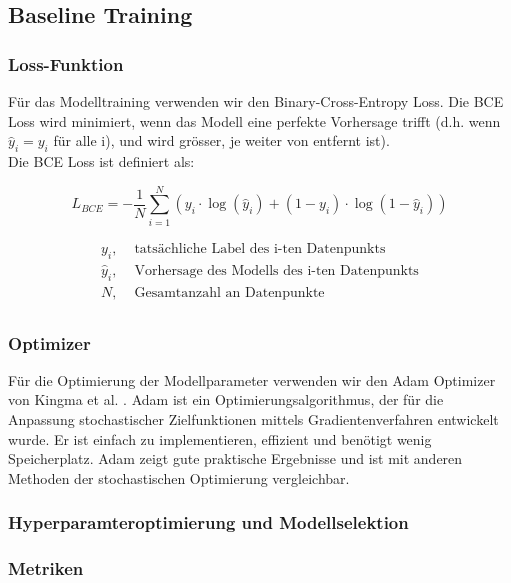 \subsection{Baseline Training}

\subsubsection{Loss-Funktion}
Für das Modelltraining verwenden wir den Binary-Cross-Entropy Loss. Die BCE Loss wird minimiert, wenn das Modell eine perfekte Vorhersage trifft (d.h. wenn $\hat{y}_i = y_i$ für alle i), und wird grösser, je weiter von entfernt ist).  \\
Die BCE Loss ist definiert als:

\begin{equation}
    L_{BCE} = -\frac{1}{N} \sum_{i=1}^{N} (y_i \cdot \log(\hat{y}_i) + (1-y_i) \cdot \log(1-\hat{y}_i))
    \label{eq:TrainingBCE}
\end{equation}

\begin{align*}
y_i,        &\text{ tatsächliche Label des i-ten Datenpunkts} \\
\hat{y}_i,  &\text{ Vorhersage des Modells des i-ten Datenpunkts} \\
N,          &\text{ Gesamtanzahl an Datenpunkte} \\
\end{align*} 

\subsubsection{Optimizer}
Für die Optimierung der Modellparameter verwenden wir den Adam Optimizer von Kingma et al. \cite{kingma_adam_2017}. 
Adam ist ein Optimierungsalgorithmus, der für die Anpassung stochastischer Zielfunktionen mittels Gradientenverfahren entwickelt wurde. Er ist einfach zu implementieren, effizient und benötigt wenig Speicherplatz. Adam zeigt gute praktische Ergebnisse und ist mit anderen Methoden der stochastischen Optimierung vergleichbar. 

\subsubsection{Hyperparamteroptimierung und Modellselektion}

\subsubsection{Metriken}
